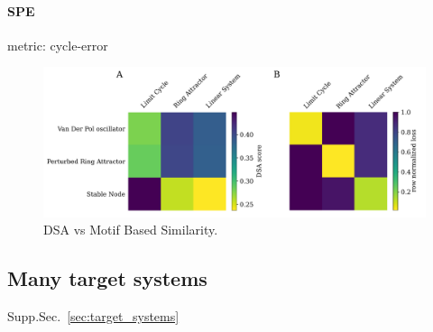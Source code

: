 \documentclass{article}
\theoremstyle{definition} \newtheorem{definition}{Definition}  \newtheorem{example}{Example}
\theoremstyle{remark} \newtheorem{remark}{Remark}
\newcounter{ct}
\begin{document}


\paragraph{SPE} %
metric: cycle-error



\begin{figure}[htbp]
    \centering
    \includegraphics[width=0.75\linewidth]{dsa_vs_mbs}
    \caption{DSA vs Motif Based Similarity.}
    \label{fig:ds_vs_mbs}
\end{figure}

\subsection{Many target systems}\label{sec:target_demonstrations}
Supp.Sec.~\ref{sec:target_systems}
\end{document}
